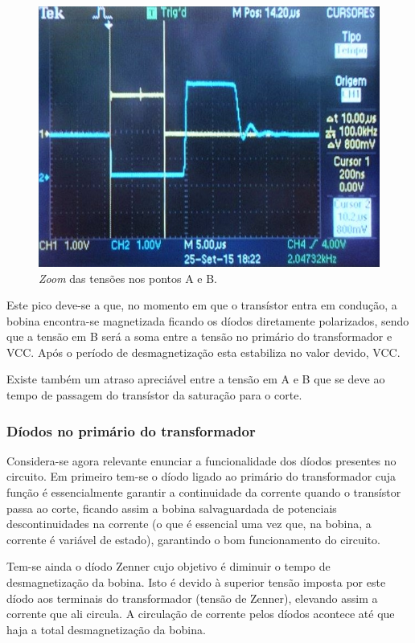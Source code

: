 \documentclass[a4paper,11pt]{article}
\numberwithin{equation}{section}
\begin{document}
\begin{figure}[h]
	\centering
	\includegraphics[keepaspectratio=true, scale=0.6]{img/fig5}
	\caption{\textit{Zoom} das tensões nos pontos A e B.}
	\label{fig:photo 2}
	\vspace{-0.8em}
\end{figure}

Este pico deve-se a que, no momento em que o transístor entra em condução, a bobina encontra-se magnetizada ficando os díodos diretamente polarizados, sendo que a tensão em B será a soma entre a tensão no primário do transformador e VCC. Após o período de desmagnetização esta estabiliza no valor devido, VCC. 

Existe também um atraso apreciável entre a tensão em A e B que se deve ao tempo de passagem do transístor da saturação para o corte.

\subsubsection{Díodos no primário do transformador}

Considera-se agora relevante enunciar a funcionalidade dos díodos presentes no circuito. Em primeiro tem-se o díodo ligado ao primário do transformador cuja função é essencialmente garantir a continuidade da corrente quando o transístor passa ao corte, ficando assim a bobina salvaguardada de potenciais descontinuidades na corrente (o que é essencial uma vez que, na bobina, a corrente é variável de estado), garantindo o bom funcionamento do circuito. 

Tem-se ainda o díodo Zenner cujo objetivo é diminuir o tempo de desmagnetização da bobina. Isto é devido à superior tensão imposta por este díodo aos terminais do transformador (tensão de Zenner), elevando assim a corrente que ali circula. A circulação de corrente pelos díodos acontece até que haja a total desmagnetização da
bobina. 
\end{document}
